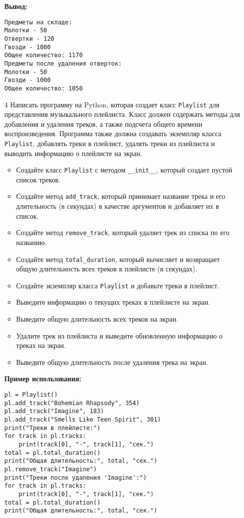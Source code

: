 \begin{enumerate}
\textbf{Вывод:}
\begin{verbatim}
Предметы на складе:
Молотки - 50
Отвертки - 120
Гвозди - 1000
Общее количество: 1170
Предметы после удаления отверток:
Молотки - 50
Гвозди - 1000
Общее количество: 1050
\end{verbatim}

\item[4] Написать программу на Python, которая создает класс \texttt{Playlist} для представления музыкального плейлиста. Класс должен содержать методы для добавления и удаления треков, а также подсчета общего времени воспроизведения. Программа также должна создавать экземпляр класса \texttt{Playlist}, добавлять треки в плейлист, удалять треки из плейлиста и выводить информацию о плейлисте на экран.

\begin{itemize}
    \item Создайте класс \texttt{Playlist} с методом \texttt{\_\_init\_\_}, который создает пустой список треков.
    \item Создайте метод \texttt{add\_track}, который принимает название трека и его длительность (в секундах) в качестве аргументов и добавляет их в список.
    \item Создайте метод \texttt{remove\_track}, который удаляет трек из списка по его названию.
    \item Создайте метод \texttt{total\_duration}, который вычисляет и возвращает общую длительность всех треков в плейлисте (в секундах).
    \item Создайте экземпляр класса \texttt{Playlist} и добавьте треки в плейлист.
    \item Выведите информацию о текущих треках в плейлисте на экран.
    \item Выведите общую длительность всех треков на экран.
    \item Удалите трек из плейлиста и выведите обновленную информацию о треках на экран.
    \item Выведите общую длительность после удаления трека на экран.
\end{itemize}

\textbf{Пример использования:}

\begin{verbatim}
pl = Playlist()
pl.add_track("Bohemian Rhapsody", 354)
pl.add_track("Imagine", 183)
pl.add_track("Smells Like Teen Spirit", 301)
print("Треки в плейлисте:")
for track in pl.tracks:
    print(track[0], "-", track[1], "сек.")
total = pl.total_duration()
print("Общая длительность:", total, "сек.")
pl.remove_track("Imagine")
print("Треки после удаления 'Imagine':")
for track in pl.tracks:
    print(track[0], "-", track[1], "сек.")
total = pl.total_duration()
print("Общая длительность:", total, "сек.")
\end{verbatim}


\end{enumerate}
